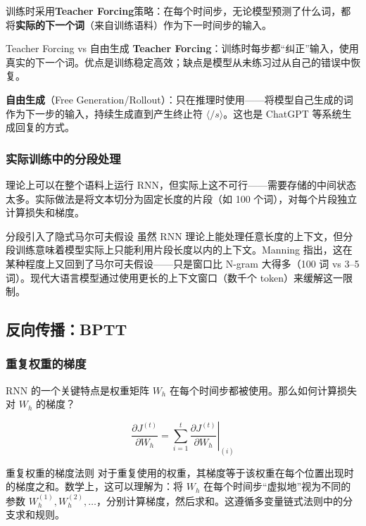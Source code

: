 \documentclass[a4paper]{article}
\begin{document}
训练时采用\textbf{Teacher Forcing}策略：在每个时间步，无论模型预测了什么词，都将\textbf{实际的下一个词}（来自训练语料）作为下一时间步的输入。

\begin{knowledgebox}{Teacher Forcing vs 自由生成}
\textbf{Teacher Forcing}：训练时每步都``纠正''输入，使用真实的下一个词。优点是训练稳定高效；缺点是模型从未练习过从自己的错误中恢复。

\textbf{自由生成}（Free Generation/Rollout）：只在推理时使用——将模型自己生成的词作为下一步的输入，持续生成直到产生终止符 $\langle/s\rangle$。这也是 ChatGPT 等系统生成回复的方式。
\end{knowledgebox}

\subsubsection{实际训练中的分段处理}

理论上可以在整个语料上运行 RNN，但实际上这不可行——需要存储的中间状态太多。实际做法是将文本切分为固定长度的片段（如 100 个词），对每个片段独立计算损失和梯度。

\begin{warningbox}{分段引入了隐式马尔可夫假设}
虽然 RNN 理论上能处理任意长度的上下文，但分段训练意味着模型实际上只能利用片段长度以内的上下文。Manning 指出，这在某种程度上又回到了马尔可夫假设——只是窗口比 N-gram 大得多（100 词 vs 3--5 词）。现代大语言模型通过使用更长的上下文窗口（数千个 token）来缓解这一限制。
\end{warningbox}

\subsection{反向传播：BPTT}

\subsubsection{重复权重的梯度}

RNN 的一个关键特点是权重矩阵 $W_h$ 在每个时间步都被使用。那么如何计算损失对 $W_h$ 的梯度？





$$\frac{\partial J^{(t)}}{\partial W_h} = \sum_{i=1}^{t} \left. \frac{\partial J^{(t)}}{\partial W_h} \right|_{(i)}$$

\begin{importantbox}{重复权重的梯度法则}
对于重复使用的权重，其梯度等于该权重在每个位置出现时的梯度之和。数学上，这可以理解为：将 $W_h$ 在每个时间步``虚拟地''视为不同的参数 $W_h^{(1)}, W_h^{(2)}, \ldots$，分别计算梯度，然后求和。这遵循多变量链式法则中的分支求和规则。
\end{importantbox}
\end{document}
